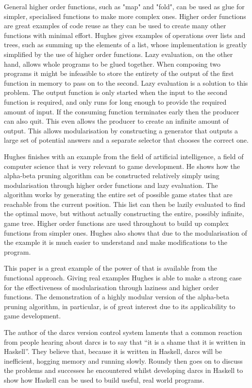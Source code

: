 General higher order functions, such as "map" and "fold", can be used as glue for
simpler, specialised functions to make more complex ones. Higher order functions
are great examples of code reuse as they can be used to create many other functions
with minimal effort. Hughes gives examples of operations over lists and trees, such
as summing up the elements of a list, whose implementation is greatly simplified
by the use of higher order functions. Lazy evaluation, on the other hand, allows
whole programs to be glued together. When composing two programs it might be
infeasible to store the entirety of the output of the first function in memory to
pass on to the second. Lazy evaluation is a solution to this problem. The output
function is only started when the input to the second function is required, and
only runs for long enough to provide the required amount of input. If the consuming
function terminates early then the producer can also quit. This even allows the
producer to create an infinite amount of output. This allows modularisation by
constructing a generator that outputs a large set of potential answers and a
separate selector that chooses the correct one.

Hughes finishes with an example from the field of artificial intelligence, a
field of computer science that is very relevant to game development. He shows
how the alpha-beta pruning algorithm can be constructed relatively simply using
modularisation through higher order functions and lazy evaluation. The algorithm
works by generating the entire set of possible game states that are reachable
from the current position. This list can then be lazily evaluated to find the
optimal move, but without actually constructing the entire, possibly infinite,
game tree. Higher order functions are used throughout to build up complex
functions from simpler ones. Hughes also shows that due to the modularisation
of the example it is much easier to understand and make modifications to the
program.

This paper is a great example of the power of that is available from the functional
approach. Giving real examples Hughes is able to make a strong case for the
effectiveness of modularisation through laziness and higher order functions.
The demonstration of a highly modular version of the alpha-beta pruning algorithm,
in particular, is of great interest due to its applicability to game development.

The author of the darcs version control system laments that a common reaction
from people hearing about darcs is to say that ``it is a shame that it is
written in Haskell''.\cite{roundy2005darcs} They believe that, because it is
written in Haskell, darcs will be inefficient, hogging memory and running slowly.
Roundy then goes on to discuss the problems and successes he encountered whilst
developing darcs in Haskell to show how Haskell can be used to build useful, real
world programs.

